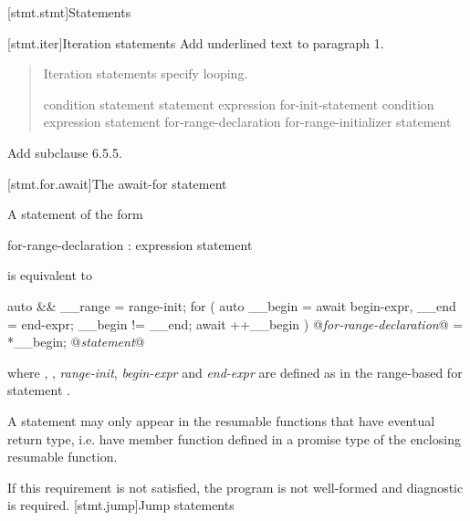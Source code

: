 
[stmt.stmt]{Statements}%

\setcounter{section}{4}
[stmt.iter]{Iteration statements}%
Add underlined text to paragraph 1.

\begin{quote}
\pnum
Iteration statements specify looping.

%
%
%
%
\begin{bnf}
	\br
	 condition \terminal{)} statement\br
	 statement  expression \terminal{) ;}\br
	 for-init-statement condition\opt \terminal{;} expression\opt \terminal{)} statement\br
	 for-range-declaration \terminal{:} for-range-initializer \terminal{)} statement\br
\end{bnf}
\end{quote}

Add subclause 6.5.5.

\setcounter{subsection}{4}
[stmt.for.await]{The await-for statement}%

\pnum
A  statement of the form

\begin{ncbnf}
	 for-range-declaration : expression \terminal{)} statement
\end{ncbnf}

is equivalent to

\begin{codeblock}
	{
		auto && __range = range-init;
		for ( auto __begin = await begin-expr,
		__end = end-expr;
		__begin != __end;
		await ++__begin ) {
			@\textit{for-range-declaration}@ = *__begin;
			@\textit{statement}@
		}
	}
\end{codeblock}

where , , 
\textit{range-init}, \textit{begin-expr} and \textit{end-expr} are defined as in the range-based for statement .

\pnum
A  statement may only appear in the resumable functions 
that have eventual return type, i.e. have  member
function defined in a promise type of the enclosing resumable function.

If this requirement is not satisfied, the program is not well-formed and diagnostic is required.
\setcounter{section}{5}
[stmt.jump]{Jump statements}%

